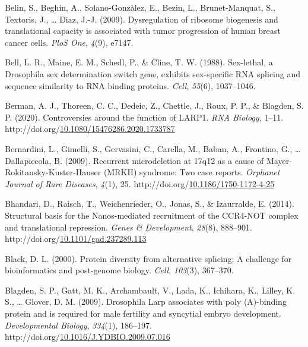 \documentclass[12pt,oneside]{reedthesis}
\newlength{\cslhangindent}
\newenvironment{CSLReferences}[2] %
 {%
  \setlength{\parindent}{0pt}
  \ifodd #1 \everypar{\setlength{\hangindent}{\cslhangindent}}\ignorespaces\fi
  \ifnum #2 > 0
  \setlength{\parskip}{#2\baselineskip}
  \fi
 }%
 {}
\begin{document}
\begin{CSLReferences}{1}{0}
\leavevmode{}%
Belin, S., Beghin, A., Solano-Gonzàlez, E., Bezin, L., Brunet-Manquat, S., Textoris, J., \ldots{} Diaz, J.-J. (2009). Dysregulation of ribosome biogenesis and translational capacity is associated with tumor progression of human breast cancer cells. \emph{PloS One}, \emph{4}(9), e7147.

\leavevmode{}%
Bell, L. R., Maine, E. M., Schedl, P., \& Cline, T. W. (1988). Sex-lethal, a {Drosophila} sex determination switch gene, exhibits sex-specific {RNA} splicing and sequence similarity to {RNA} binding proteins. \emph{Cell}, \emph{55}(6), 1037--1046.

\leavevmode{}%
Berman, A. J., Thoreen, C. C., Dedeic, Z., Chettle, J., Roux, P. P., \& Blagden, S. P. (2020). Controversies around the function of {LARP1}. \emph{RNA Biology}, 1--11. http://doi.org/\href{https://doi.org/10.1080/15476286.2020.1733787}{10.1080/15476286.2020.1733787}

\leavevmode{}%
Bernardini, L., Gimelli, S., Gervasini, C., Carella, M., Baban, A., Frontino, G., \ldots{} Dallapiccola, B. (2009). Recurrent microdeletion at 17q12 as a cause of {Mayer}-{Rokitansky}-{Kuster}-{Hauser} ({MRKH}) syndrome: Two case reports. \emph{Orphanet Journal of Rare Diseases}, \emph{4}(1), 25. http://doi.org/\href{https://doi.org/10.1186/1750-1172-4-25}{10.1186/1750-1172-4-25}

\leavevmode{}%
Bhandari, D., Raisch, T., Weichenrieder, O., Jonas, S., \& Izaurralde, E. (2014). Structural basis for the {Nanos}-mediated recruitment of the {CCR4}-{NOT} complex and translational repression. \emph{Genes \& Development}, \emph{28}(8), 888--901. http://doi.org/\href{https://doi.org/10.1101/gad.237289.113}{10.1101/gad.237289.113}

\leavevmode{}%
Black, D. L. (2000). Protein diversity from alternative splicing: A challenge for bioinformatics and post-genome biology. \emph{Cell}, \emph{103}(3), 367--370.

\leavevmode{}%
Blagden, S. P., Gatt, M. K., Archambault, V., Lada, K., Ichihara, K., Lilley, K. S., \ldots{} Glover, D. M. (2009). Drosophila {Larp} associates with poly ({A})-binding protein and is required for male fertility and syncytial embryo development. \emph{Developmental Biology}, \emph{334}(1), 186--197. http://doi.org/\href{https://doi.org/10.1016/J.YDBIO.2009.07.016}{10.1016/J.YDBIO.2009.07.016}


\end{CSLReferences}
\end{document}
